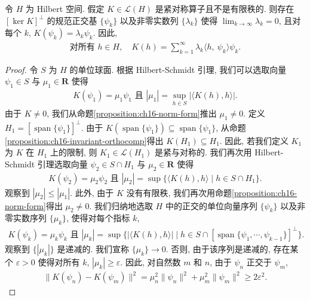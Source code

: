 \documentclass[../../main.tex]{subfiles}
\begin{document}
\begin{theorem}\label{theorem:ch16-hilbert-schmidt}
令 $H$ 为 Hilbert 空间. 假定 $K\in\mathcal{L}(H)$ 是紧对称算子且不是有限秩的. 则存在 $[\ker K]^{\perp}$ 的规范正交基 $\{\psi_{k}\}$ 以及非零实数列 $\{\lambda_{k}\}$ 使得 $\lim_{k\to\infty}\lambda_{k}=0$, 且对每个 $k$, $K(\psi_{k})=\lambda_{k}\psi_{k}$. 因此,
\begin{align}
\text{对所有 }h\in H,\quad K(h)=\sum_{k=1}^{\infty}\lambda_{k}\langle h,\ \psi_{k}\rangle\psi_{k}.\label{align:ch16-hs-theorem}
\end{align}
\end{theorem}

\begin{proof}
令 $S$ 为 $H$ 的单位球面. 根据 Hilbert-Schmidt 引理, 我们可以选取向量 $\psi_{1}\in S$ 与 $\mu_{1}\in\mathbf{R}$ 使得
\begin{align*}
K(\psi_{1})=\mu_{1}\psi_{1}\text{ 且 }|\mu_{1}|=\sup_{h\in S}|\langle K(h),h\rangle|.
\end{align*}
由于 $K\neq 0$, 我们从命题\cref{proposition:ch16-norm-form}推出 $\mu_{1}\neq 0$. 定义 $H_{1}=[\operatorname{span}\{\psi_{1}\}]^{\perp}$. 由于 $K(\operatorname{span}\{\psi_{1}\})\subseteq\operatorname{span}\{\psi_{1}\}$, 从命题\cref{proposition:ch16-invariant-orthocomp}得出 $K(H_{1})\subseteq H_{1}$. 因此, 若我们定义 $K_{1}$ 为 $K$ 在 $H_{1}$ 上的限制, 则 $K_{1}\in\mathcal{L}(H_{1})$ 是紧与对称的. 我们再次用 Hilbert-Schmidt 引理选取向量 $\psi_{2}\in S\cap H_{1}$ 与 $\mu_{2}\in\mathbf{R}$ 使得
\begin{align*}
K(\psi_{2})=\mu_{2}\psi_{2}\text{ 且 }|\mu_{2}|=\sup\{\langle K(h),h\rangle\mid h\in S\cap H_{1}\}.
\end{align*}
观察到 $|\mu_{2}|\leqslant|\mu_{1}|$. 此外, 由于 $K$ 没有有限秩, 我们再次用命题\cref{proposition:ch16-norm-form}得出 $\mu_{2}\neq 0$. 我们归纳地选取 $H$ 中的正交的单位向量序列 $\{\psi_{k}\}$ 以及非零实数序列 $\{\mu_{k}\}$, 使得对每个指标 $k$,
\begin{align}
K(\psi_{k})=\mu_{k}\psi_{k}\text{ 且 }|\mu_{k}|=\sup\{|\langle K(h),h\rangle|\mid h\in S\cap[\operatorname{span}\{\psi_{1},\cdots,\psi_{k-1}\}]^{\perp}\}.\label{align:ch16-hs-recursion}
\end{align}
观察到 $\{|\mu_{k}|\}$ 是递减的. 我们宣称 $\{\mu_{k}\}\to 0$. 否则, 由于该序列是递减的, 存在某个 $\varepsilon>0$ 使得对所有 $k$, $|\mu_{k}|\geqslant\varepsilon$. 因此, 对自然数 $m$ 和 $n$, 由于 $\psi_{n}$ 正交于 $\psi_{m}$,
\begin{align*}
\|K(\psi_{n})-K(\psi_{m})\|^{2}=\mu_{n}^{2}\|\psi_{n}\|^{2}+\mu_{m}^{2}\|\psi_{m}\|^{2}\geqslant 2\varepsilon^{2}.

\end{align*}
\end{proof}
\end{document}

